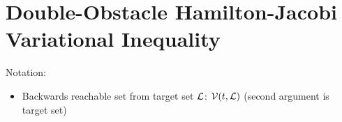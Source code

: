 \section{Double-Obstacle Hamilton-Jacobi Variational Inequality \label{sec:HJIVI}}
Notation:
\begin{itemize}
\item Backwards reachable set from target set $\mathcal{L}$: $\mathcal{V}(t, \mathcal{L})$ (second argument is target set)
\end{itemize}